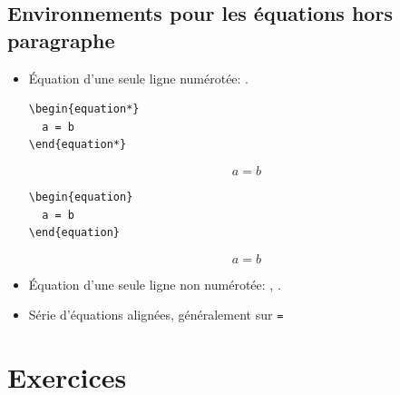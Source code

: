 \subsection{Environnements pour les équations hors paragraphe}

\begin{itemize}
\item Équation d'une seule ligne numérotée: .
  \renewcommand{\theequation}{\arabic{equation}}
  \begin{eqxample}
\begin{lstlisting}
\begin{equation*}
  a = b
\end{equation*}
\end{lstlisting}
    \producing
    \begin{equation*}
      a = b
    \end{equation*}
  \end{eqxample}

  \begin{eqxample}
\begin{lstlisting}
\begin{equation}
  a = b
\end{equation}
\end{lstlisting}
    \producing
    \begin{equation}
      a = b
    \end{equation}
  \end{eqxample}

\item Équation d'une seule ligne non numérotée: , .
\item Série d'équations alignées, généralement sur \verb|=|
\end{itemize}



\section{Exercices}
\label{sec:apparence:exercices}

